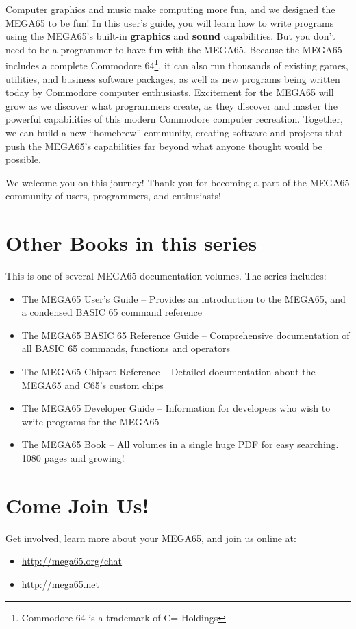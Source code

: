 Computer graphics and music make computing more fun, and we designed the MEGA65 to be fun! In this user's guide, you will learn how to write programs using the MEGA65's built-in {\bf graphics} and {\bf sound} capabilities. But you don't need to be a programmer to have fun with the MEGA65. Because the MEGA65 includes a complete Commodore{\textregistered} 64{\texttrademark}\footnote{Commodore 64 is a trademark of C= Holdings}, it can also run thousands of existing games, utilities, and business software packages, as well as new programs being written today by Commodore computer enthusiasts. Excitement for the MEGA65 will grow as we discover what programmers create, as they discover and master the powerful capabilities of this modern Commodore computer recreation. Together, we can build a new ``homebrew'' community, creating software and projects that push the MEGA65's capabilities far beyond what anyone thought would be possible.

We welcome you on this journey! Thank you for becoming a part of the MEGA65
community of users, programmers, and enthusiasts!

\section{Other Books in this series}

This is one of several MEGA65 documentation volumes. The series includes:

\begin{itemize}
    \item The MEGA65 User's Guide -- Provides an introduction to the MEGA65, and a condensed BASIC 65 command reference
    \item The MEGA65 BASIC 65 Reference Guide -- Comprehensive documentation of all BASIC 65 commands, functions and operators
    \item The MEGA65 Chipset Reference -- Detailed documentation about the MEGA65 and C65's custom chips
    \item The MEGA65 Developer Guide -- Information for developers who wish to write programs for the MEGA65
    \item The MEGA65 Book -- All volumes in a single huge PDF for easy searching. 1080 pages and growing!
\end{itemize}

\section{Come Join Us!}
Get involved, learn more about your MEGA65, and join us online at:

\begin{itemize}
    \item \url{http://mega65.org/chat}
    \item \url{http://mega65.net}
\end{itemize}
